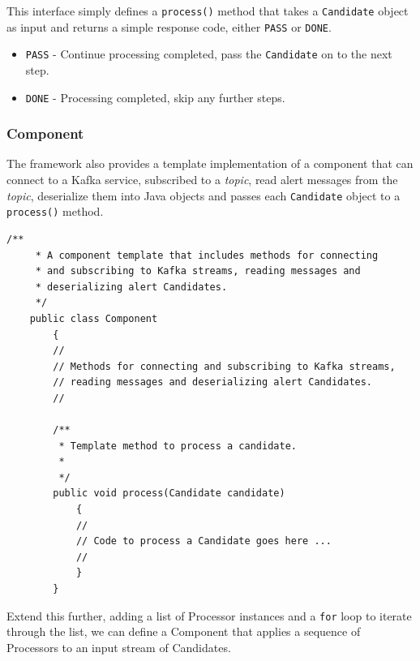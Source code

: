 \documentclass{article}
\newcommand{\kftopic} {\textit{topic}\xspace}
\newcommand{\deserz}    {deserialize\xspace}
\newcommand{\javaname}[1] {{\ttfamily\color{codeblue} #1}}
\newcommand{\javaplural}[1] {\javaname{#1}s}
\begin{document}
This interface simply defines a \texttt{process()} method that takes a \texttt{Candidate} object as input and
returns a simple response code, either \texttt{PASS} or \texttt{DONE}.

\begin{itemize}
  \item \texttt{PASS} - Continue processing completed, pass the \texttt{Candidate} on to the next step.
  \item \texttt{DONE} - Processing completed, skip any further steps.
\end{itemize}

\subsubsection{Component}
\label{java-interfaces.Component}

The framework also provides a template implementation of a component that can connect to a Kafka service, subscribed to a \kftopic, read alert messages from the \kftopic, \deserz them into Java objects and passes each \texttt{Candidate} object to a \texttt{process()} method.

\begin{lstlisting}[style=Java]
    /**
     * A component template that includes methods for connecting
     * and subscribing to Kafka streams, reading messages and
     * deserializing alert Candidates.
     */
    public class Component
        {
        //
        // Methods for connecting and subscribing to Kafka streams,
        // reading messages and deserializing alert Candidates.
        //

        /**
         * Template method to process a candidate.
         *
         */
        public void process(Candidate candidate)
            {
            //
            // Code to process a Candidate goes here ...
            //
            }
        }
\end{lstlisting}

Extend this further, adding a list of \javaname{Processor} instances and a \texttt{for} loop to iterate through the list, we can define a \javaname{Component} that applies a sequence of \javaplural{Processor} to an input stream of \javaplural{Candidate}.
\end{document}
